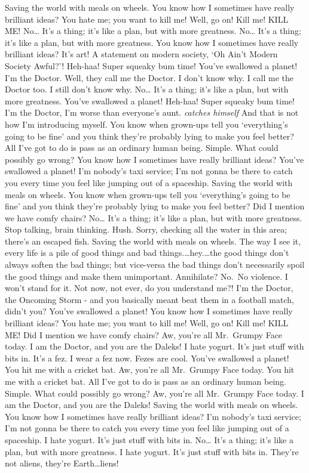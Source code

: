 Saving the world with meals on wheels. You know how I sometimes have
really brilliant ideas? You hate me; you want to kill me! Well, go on!
Kill me! KILL ME! No\ldots{} It's a thing; it's like a plan, but with
more greatness. No\ldots{} It's a thing; it's like a plan, but with more
greatness. You know how I sometimes have really brilliant ideas? It's
art! A statement on modern society, `Oh Ain't Modern Society Awful?'!
Heh-haa! Super squeaky bum time! You've swallowed a planet! I'm the
Doctor. Well, they call me the Doctor. I don't know why. I call me the
Doctor too. I still don't know why. No\ldots{} It's a thing; it's like a
plan, but with more greatness. You've swallowed a planet! Heh-haa! Super
squeaky bum time! I'm the Doctor, I'm worse than everyone's aunt.
\emph{catches himself} And that is not how I'm introducing myself. You
know when grown-ups tell you `everything's going to be fine' and you
think they're probably lying to make you feel better? All I've got to do
is pass as an ordinary human being. Simple. What could possibly go
wrong? You know how I sometimes have really brilliant ideas? You've
swallowed a planet! I'm nobody's taxi service; I'm not gonna be there to
catch you every time you feel like jumping out of a spaceship. Saving
the world with meals on wheels. You know when grown-ups tell you
`everything's going to be fine' and you think they're probably lying to
make you feel better? Did I mention we have comfy chairs? No\ldots{}
It's a thing; it's like a plan, but with more greatness. Stop talking,
brain thinking. Hush. Sorry, checking all the water in this area;
there's an escaped fish. Saving the world with meals on wheels. The way
I see it, every life is a pile of good things and bad
things.\ldots{}hey.\ldots{}the good things don't always soften the bad
things; but vice-versa the bad things don't necessarily spoil the good
things and make them unimportant. Annihilate? No.~No violence. I won't
stand for it. Not now, not ever, do you understand me?! I'm the Doctor,
the Oncoming Storm - and you basically meant beat them in a football
match, didn't you? You've swallowed a planet! You know how I sometimes
have really brilliant ideas? You hate me; you want to kill me! Well, go
on! Kill me! KILL ME! Did I mention we have comfy chairs? Aw, you're all
Mr.~Grumpy Face today. I am the Doctor, and you are the Daleks! I hate
yogurt. It's just stuff with bits in. It's a fez. I wear a fez now.
Fezes are cool. You've swallowed a planet! You hit me with a cricket
bat. Aw, you're all Mr.~Grumpy Face today. You hit me with a cricket
bat. All I've got to do is pass as an ordinary human being. Simple. What
could possibly go wrong? Aw, you're all Mr.~Grumpy Face today. I am the
Doctor, and you are the Daleks! Saving the world with meals on wheels.
You know how I sometimes have really brilliant ideas? I'm nobody's taxi
service; I'm not gonna be there to catch you every time you feel like
jumping out of a spaceship. I hate yogurt. It's just stuff with bits in.
No\ldots{} It's a thing; it's like a plan, but with more greatness. I
hate yogurt. It's just stuff with bits in. They're not aliens, they're
Earth\ldots{}liens!



